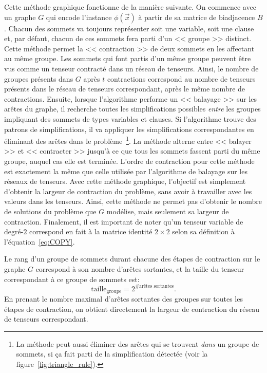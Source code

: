 Cette méthode graphique fonctionne de la manière suivante.
On commence avec un graphe $G$ qui encode l'instance $\phi(\vec{x})$ à partir de sa matrice de biadjacence $B$.
Chacun des sommets va toujours représenter soit une variable, soit une clause et, par défaut, chacun de ces sommets fera parti d'un << groupe >> distinct.
Cette méthode permet la << contraction >> de deux sommets en les affectant au même groupe.
Les sommets qui font partis d'un même groupe peuvent être vus comme un tenseur contracté dans un réseau de tenseurs.
Ainsi, le nombre de groupes présents dans $G$ après $t$ contractions correspond au nombre de tenseurs présents dans le réseau de tenseurs correspondant, après le même nombre de contractions.
Ensuite, lorsque l'algorithme performe un << balayage >> sur les arêtes du graphe, il recherche toutes les simplifications possibles \emph{entre} les groupes impliquant des sommets de types variables et clauses.
Si l'algorithme trouve des patrons de simplifications, il va appliquer les simplifications correspondantes en éliminant des arêtes dans le problème~\footnote{La méthode peut aussi éliminer des arêtes qui se trouvent \emph{dans} un groupe de sommets, si ça fait parti de la simplification détectée (voir la figure~\ref{fig:triangle_rule}).}.
La méthode alterne entre << balayer >> et << contracter >> jusqu'à ce que tous les sommets fassent parti du même groupe, auquel cas elle est terminée.
L'ordre de contraction pour cette méthode est exactement la même que celle utilisée par l'algorithme de balayage sur les réseaux de tenseurs.
Avec cette méthode graphique, l'objectif est simplement d'obtenir la largeur de contraction du problème, sans avoir à travailler avec les valeurs dans les tenseurs.
Ainsi, cette méthode ne permet pas d'obtenir le nombre de solutions du problème que $G$ modélise, mais seulement sa largeur de contraction.
Finalement, il est important de noter qu'un tenseur variable de degré-$2$ correspond en fait à la matrice identité $2 \times 2$ selon sa définition à l'équation~\ref{eq:COPY}.

Le rang d'un groupe de sommets durant chacune des étapes de contraction sur le graphe $G$ correspond à son nombre d'arêtes sortantes, et la taille du tenseur correspondant à ce groupe de sommets est:
\begin{equation} \label{eq:size-cluster}
    \mathrm{taille}_{\mathrm{groupe}} = 2^{\text{\#arêtes sortantes}}.
\end{equation}
En prenant le nombre maximal d'arêtes sortantes des groupes sur toutes les étapes de contraction, on obtient directement la largeur de contraction du réseau de tenseurs correspondant.


